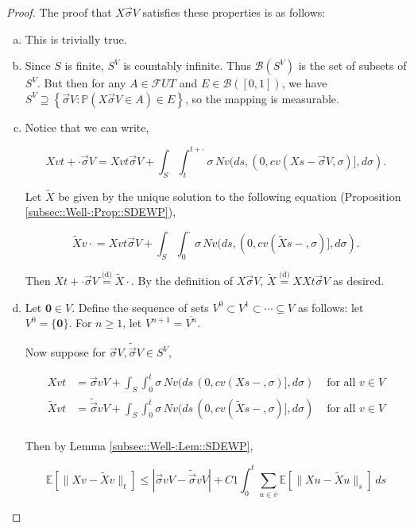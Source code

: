 \documentclass[12pt]{article}
\newcommand{\mb}{\mathbb}
\newcommand{\mc}{\mathcal}
\newcommand{\ms}{\mathscr}
\newcommand{\ov}{\overline}
\newcommand{\te}{\text}
\newcommand{\ind}{\hspace{24pt}}
\newcommand{\pr}{\mb{P}}							%
\newcommand{\ex}[1]{\mb{E}\left[#1\right]}			%
\newcommand{\deq}{\overset{\text{(d)}}{=}}			%
\renewcommand{\root}{\mathbf{0}}				%
\renewcommand{\v}{v}							%
\newcommand{\vv}{u}								%
\renewcommand{\U}{U}							%
\renewcommand{\S}{S}							%
\newcommand{\s}{\sigma}							%
\newcommand{\sv}{\vec{\s}}						%
\newcommand{\T}{T}								%
\renewcommand{\t}{t}							%
\renewcommand{\tt}{s}							%
\newcommand{\F}{\mc{F}}							%
\newcommand{\X}{X}								%
\newcommand{\IGr}{c}							%
\newcommand{\cl}{\ov}							%
\newcommand{\const}{C}							%
\newcommand{\sln}[1]{^{#1}}						%
\newcommand{\poiss}{N}							%
\newcommand{\alt}[1]{\widetilde{#1}}			%
\begin{document}
\begin{proof}
The proof that \(\X{}{}{\sv{}{ V}}\) satisfies these properties is as follows:

\begin{enumerate}[(a)]
\item This is trivially true.

\item Since \(\S\) is finite, \(\S^ V\) is countably infinite. Thus \(\ms{B}(\S^ V)\) is the set of subsets of \(\S^ V\). But then for any \(A \in \F{\U}{\T}\) and \(E \in \ms{B}([0,1])\), we have \(\S^ V \supseteq \left\{\sv{}{ V}: \pr\left(\X{}{}{\sv{}{ V}} \in A\right) \in E\right\}\), so the mapping is measurable.

\item Notice that we can write,

\[\X{\v}{\t+\cdot}{\sv{}{ V}} = \X{\v}{\t}{\sv{}{ V}} + \int_\S\int_\t^{\t+\cdot} \s\,\poiss{\v}(d\tt,(0,\IGr{\v}(\X{}{\tt-}{\sv{}{ V}},\s)],d\s).\]

Let \(\alt{\X}{{}{}}\) be given by the unique solution to the following equation (Proposition \ref{subsec::Well-:Prop::SDEWP}),

\[\alt{\X}{{\v}{\cdot}} = \X{\v}{\t}{\sv{}{ V}} + \int_\S \int_0^\cdot \s\,\poiss{\v}(d\tt,(0,\IGr{\v}(\alt{\X}{{}{\tt-}},\s)],d\s).\]

Then \(\X{}{\t+\cdot}{\sv{}{ V}} \deq \alt{\X}{{}{\cdot}}\). By the definition of \(\X{}{}{\sv{}{ V}}\), \(\alt{\X}{{}{}} \deq \X{}{}{\X{}{\t}{\sv{}{ V}}}\) as desired.

\item Let \(\root \in  V\). Define the sequence of sets \( V\sln{0}\subset  V\sln{1}\subset \cdots \subseteq  V\) as follows: let \( V\sln{0} = \{\root\}\). For \(n \geq 1\), let \( V\sln{n+1} = \cl{ V\sln{n}}\).

\ind Now suppose for \(\sv{}{ V},\alt{\sv}{}{V}\in \S^ V\),

\begin{align*}
\X{\v}{\t} &= \sv{\v}{ V} + \int_\S\int_0^\t \s\,\poiss{\v}(d\tt\,(0,\IGr{\v}(\X{}{\tt-},\s)],d\s)&\te{ for all } \v \in  V\\
\alt{\X}{{\v}{\t}} &= \alt{\sv}{\v}{V} + \int_\S\int_0^\t \s\,\poiss{\v}(d\tt\,(0,\IGr{\v}(\alt{\X}{{}{\tt-}},\s)],d\s)&\te{ for all } \v \in  V\\
\end{align*}

Then by Lemma \ref{subsec::Well-:Lem::SDEWP},

\[\ex{\|\X{\v}{} - \alt{\X}{{\v}{}}\|_\t} \leq |\sv{\v}{ V} - \alt{\sv}{\v}{V}| + \const{1}\int_0^\t \sum_{\vv\in \cl{\v}} \ex{\|\X{\vv}{} - \alt{\X}{{\vv}{}}\|_\tt}\,d\tt\]


\end{enumerate}
\end{proof}
\end{document}
